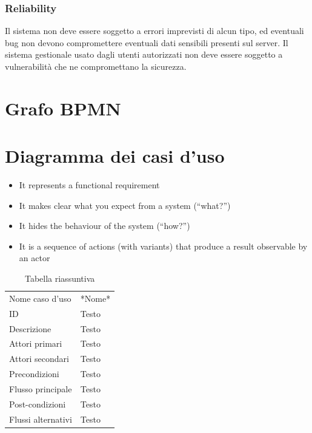 \documentclass{article}
\begin{document}
\subsubsection{Reliability}
Il sistema non deve essere soggetto a errori imprevisti di alcun tipo, ed eventuali bug non devono compromettere eventuali dati sensibili presenti sul server.
Il sistema gestionale usato dagli utenti autorizzati non deve essere soggetto a vulnerabilità che ne compromettano la sicurezza. 

\clearpage

\section{Grafo BPMN}
\clearpage

\section{Diagramma dei casi d'uso}

\begin{itemize}
    \item It represents a functional requirement
    \item It makes clear what you expect from a system (“what?”)
    \item It hides the behaviour of the system (“how?”)
    \item It is a sequence of actions (with variants) that produce a result observable by an actor
\end{itemize}


\begin{table}[htbp]
    \centering
    \begin{tabularx}{\textwidth}{| l | p{} |}
        \Xhline{2pt} %
        Nome caso d'uso & *Nome* \\
        \Xhline{2pt} %
        ID & Testo \\
        \hline
        Descrizione & Testo \\
        \hline
        Attori primari & Testo \\
        \hline
        Attori secondari & Testo \\
        \hline
        Precondizioni & Testo \\
        \hline
        Flusso principale & Testo \\
        \hline
        Post-condizioni & Testo \\
        \hline
        Flussi alternativi & Testo \\
        \hline
    \end{tabularx}
    \caption{Tabella riassuntiva}
    \label{tab:tabella_use_case}
\end{table}
\end{document}
